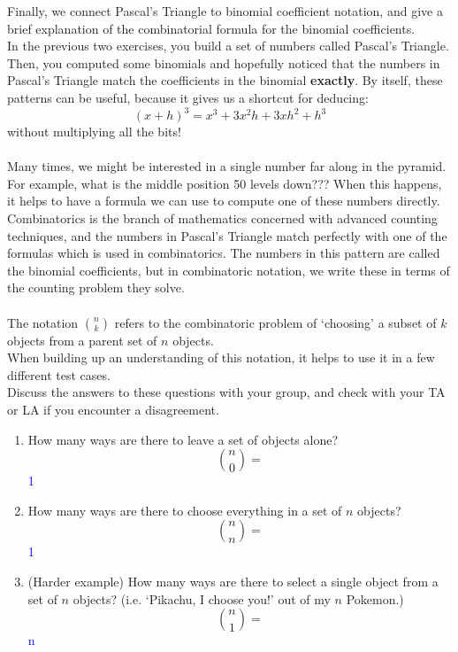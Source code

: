\documentclass{ximera}
\begin{document}
\begin{exercise}
    Finally, we connect Pascal's Triangle to binomial coefficient notation, and give a brief explanation of the combinatorial formula for the binomial coefficients.  \\
    In the previous two exercises, you build a set of numbers called Pascal's Triangle.  Then, you computed some binomials and hopefully noticed that the numbers in Pascal's Triangle match the coefficients in the binomial \textbf{exactly}.  By itself, these patterns can be useful, because it gives us a shortcut for deducing:
    \[(x+h)^3=x^3+3x^2h+3xh^2+h^3\]
    without multiplying all the bits! \\
    \\
    Many times, we might be interested in a single number far along in the pyramid. For example, what is the middle position 50 levels down??? When this happens, it helps to have a formula we can use to compute one of these numbers directly.  Combinatorics is the branch of mathematics concerned with advanced counting techniques, and the numbers in Pascal's Triangle match perfectly with one of the formulas which is used in combinatorics.  The numbers in this pattern are called the binomial coefficients, but in combinatoric notation, we write these in terms of the counting problem they solve. \\
    \\
    The notation ${n \choose k}$ refers to the combinatoric problem of `choosing' a subset of $k$ objects from a parent set of $n$ objects.\\
    When building up an understanding of this notation, it helps to use it in a few different test cases. \\
    Discuss the answers to these questions with your group, and check with your TA or LA if you encounter a disagreement.
    \begin{enumerate}
        \item How many ways are there to leave a set of objects alone?
        \[{n\choose 0}=\]
        \textcolor{blue}{1}
        \item How many ways are there to choose everything in a set of $n$ objects?
        \[{n \choose n}=\]
        \textcolor{blue}{1}
        \item (Harder example) How many ways are there to select a single object from a set of $n$ objects? (i.e. `Pikachu, I choose you!' out of my $n$ Pokemon.)
        \[{n\choose 1}=\]
        \textcolor{blue}{n}
    \end{enumerate}

\end{exercise}
\end{document}
